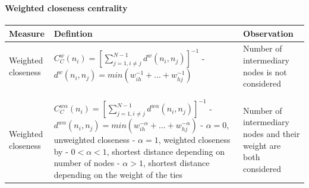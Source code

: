\documentclass[8pt]{beamer}
\begin{document}

\begin{frame}
\frametitle{\insertsection}
\framesubtitle{Weighted closeness centrality}

\scriptsize
\begin{table}
\begin{tabular}{p{2cm}p{6.5cm}p{2cm}}
\toprule
\textbf{Measure} & \textbf{Defintion} & \textbf{Observation}\\
\midrule
Weighted \newline closeness\newline\cite{Newman2001b}&
$C_C^w(n_i) = \left[\sum_{j=1, i \neq j}^{N-1} d^w(n_i, n_j)\right]^{-1}$\newline
\newline
\newline
- $d^w(n_i, n_j) = min(w_{ih}^{-1}+ ... + w_{hj}^{-1})$&
Number of intermediary nodes is not considered\\
\\
\hline
\\
Weighted \newline closeness\newline\cite{Opsahl2010} & 
$C_C^{w\alpha}(n_i) = \left[\sum_{j=1, i \neq j}^{N-1} d^{w\alpha}(n_i, n_j)\right]^{-1}$\newline
\newline
\newline
- $d^{w\alpha}(n_i, n_j) = min(w_{ih}^{-\alpha}+ ... + w_{hj}^{-\alpha})$\newline
- $\alpha=0$, unweighted closeness\newline
- $\alpha=1$, weighted closeness by \cite{Newman2001b}\newline
- $0<\alpha<1$, shortest distance depending on number of nodes\newline
- $\alpha>1$, shortest distance depending on the weight of the ties&
Number of intermediary nodes and their weight are both considered\\
\bottomrule
\end{tabular}
\end{table}

\end{frame}

\end{document}
